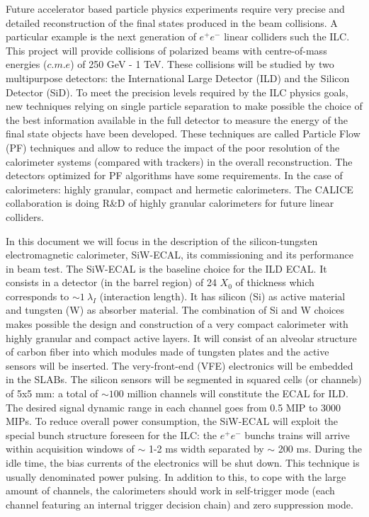 \documentclass[final,3p,times,twocolumn]{elsarticle}
\begin{document}
Future accelerator based particle physics experiments
require very precise and detailed reconstruction of the final states produced
in the beam collisions. A particular example is the next generation of $e^{+}e^{-}$
linear colliders such the ILC\cite{Behnke:2013xla,Baer:2013cma,Adolphsen:2013jya,Adolphsen:2013kya,Behnke:2013lya}.
This project will provide collisions of polarized beams with centre-of-mass energies ($c.m.e$) of 250 GeV - 1 TeV.
These collisions will be studied by two multipurpose detectors:
the International Large Detector (ILD) and the Silicon Detector (SiD)\cite{Behnke:2013lya}.
To meet the precision levels required by the ILC %
physics goals,
new techniques relying on single particle separation to make possible the choice of the best information available
in the full detector to measure the energy of the final state objects have been developed.
These techniques are called Particle Flow (PF) techniques \cite{Brient:2002gh,Morgunov:2004ed,Sefkow:2015hna}
and allow to reduce the impact of the poor resolution of the calorimeter systems (compared with trackers) in the overall reconstruction.
The detectors optimized for PF algorithms have some requirements. In the case of calorimeters: highly granular, compact
and hermetic calorimeters. 
The CALICE collaboration is doing R\&D of highly granular calorimeters \cite{Sefkow:2015hna} 
for future linear colliders.

In this document we will focus in the description of the silicon-tungsten electromagnetic calorimeter,
SiW-ECAL, its commissioning and its performance in beam test.
The SiW-ECAL is the baseline choice for the ILD ECAL. It consists in a detector (in the barrel region) of 24 $X_{0}$ of thickness which corresponds to $\sim 1~\lambda_{I}$ (interaction length).
It has silicon (Si) as active material and tungsten (W) as absorber material.
The combination of Si and W choices  makes possible the design and construction
of a very compact calorimeter with highly granular and compact active layers.
It will consist of an alveolar structure of carbon fiber into which modules made of tungsten
plates and the active sensors will be inserted. The very-front-end (VFE) electronics will be
embedded in the SLABs. The silicon sensors will be segmented
in squared cells (or channels) of 5x5 mm: a total of $\sim 100$ million channels will constitute the ECAL for ILD.
The desired signal dynamic range in each channel goes from 0.5 MIP to 3000 MIPs.
To reduce overall power consumption, the SiW-ECAL will exploit the special bunch structure
foreseen for the ILC: the $e^{+}e^{-}$ bunchs trains will arrive within
acquisition windows of $\sim$ 1-2 ms width separated by $\sim$ 200 ms. During the idle time, the bias currents of the electronics will be shut down.
This technique is usually denominated power pulsing. In addition to this, to cope with the large amount of channels,
the calorimeters should work in self-trigger mode (each channel featuring an internal trigger decision chain) and zero suppression mode. 
\end{document}
